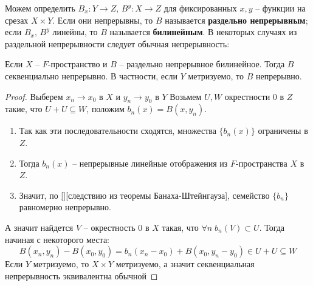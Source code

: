 \documentclass[12pt, a4paper, oneside]{book}
\begin{document}
Можем определить $B_x:Y\to Z,\, B^y:X \to Z$ для фиксированных $x,y$ -- функции на срезах $X\times Y$.  Если они непрерывны, то $B$ называется \textbf{раздельно непрерывным}; если $B_x, \, B^y$ линейны, то $B$ называется \textbf{билинейным}.
В некоторых случаях из раздельной непрерывности следует обычная непрерывность:
\begin{theorem}
    Если $X$ -- $F$-пространство и $B$ -- раздельно непрерывное билинейное. Тогда $B$ секвенциально непрерывно. В частности, если $Y$ метризуемо, то $B$ непрерывно.
\end{theorem}
\begin{proof}
    Выберем $x_n \to x_0$ в $X$ и $y_n \to y_0$ в $Y$
Возьмем $U, W$ окрестности 0 в $Z$ такие, что $U+U \subseteq W$, положим $b_n(x) = B(x,y_n)$.
    \begin{enumerate}
        \item  Так как эти последовательности сходятся, множества $\{b_n(x)\}$ ограничены в $Z$.
        \item  Тогда $b_n(x)$ --  непрерывные линейные отображения из $F$-пространства $X$ в $Z$.
        \item  Значит, по \ref{}[следствию из теоремы Банаха-Штейнгауза], семейство $\{b_n\}$ равномерно непрерывно.
    \end{enumerate}
    А значит найдется $V$ -- окрестность 0 в $X$ такая, что $\forall n\; b_n(V) \subset U$. Тогда начиная с некоторого места:
    $$B(x_n, y_n) - B(x_0,y_0) = b_n(x_n-x_0)+B(x_0,y_n-y_0) \in U + U \subseteq W$$
    Если $Y$ метризуемо, то $X\times Y$ метризуемо, а значит секвенциальная непрерывность эквивалентна обычной
\end{proof}
\end{document}
